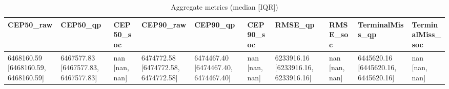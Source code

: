 \begin{table}[t]
\centering
\begin{tabular}{llllllllll}
\toprule
CEP50_raw & CEP50_qp & CEP50_soc & CEP90_raw & CEP90_qp & CEP90_soc & RMSE_qp & RMSE_soc & TerminalMiss_qp & TerminalMiss_soc \\
\midrule
6468160.59 [6468160.59, 6468160.59] & 6467577.83 [6467577.83, 6467577.83] & nan [nan, nan] & 6474772.58 [6474772.58, 6474772.58] & 6474467.40 [6474467.40, 6474467.40] & nan [nan, nan] & 6233916.16 [6233916.16, 6233916.16] & nan [nan, nan] & 6445620.16 [6445620.16, 6445620.16] & nan [nan, nan] \\
\bottomrule
\end{tabular}
\caption{Aggregate metrics (median [IQR])}
\label{tab:aggregate}
\end{table}
